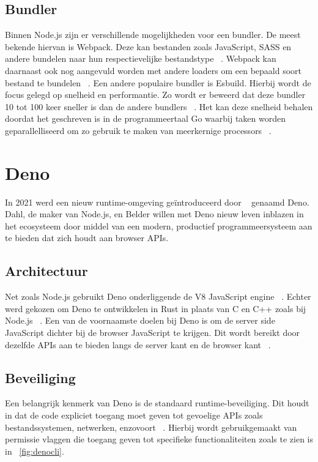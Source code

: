 \subsection{Bundler}
Binnen Node.js zijn er verschillende mogelijkheden voor een bundler. De meest bekende hiervan is Webpack. 
Deze kan bestanden zoals JavaScript, SASS en andere bundelen naar hun respectievelijke bestandstype ~\autocite{Laurila2020}. 
Webpack kan daarnaast ook nog aangevuld worden met andere loaders om een bepaald soort bestand te bundelen ~\autocite{Laurila2020}. Een andere populaire bundler is Esbuild.
Hierbij wordt de focus gelegd op snelheid en performantie. Zo wordt er beweerd dat deze bundler 10 tot 100 keer sneller is dan de andere bundlers ~\autocite{Couriol2020}.
Het kan deze snelheid behalen doordat het geschreven is in de programmeertaal Go waarbij taken worden geparallelliseerd om zo gebruik te maken van meerkernige processors ~\autocite{Couriol2020}.

\section{Deno}
In 2021 werd een nieuw runtime-omgeving geïntroduceerd door ~\textcite{Dahl2021} genaamd Deno.
Dahl, de maker van Node.js, en Belder willen met Deno nieuw leven inblazen in het ecosysteem door middel van een
modern, productief programmeersysteem aan te bieden dat zich houdt aan browser APIs.

\subsection{Architectuur}
Net zoals Node.js gebruikt Deno onderliggende de V8 JavaScript engine ~\autocite{DenoLand2023}. 
Echter werd gekozen om Deno te ontwikkelen in Rust in plaats van C en C++ zoals bij Node.js ~\autocite{DenoLand2023}.
Een van de voornaamste doelen bij Deno is om de server side JavaScript dichter bij de browser JavaScript te krijgen.
Dit wordt bereikt door dezelfde APIs aan te bieden langs de server kant en de browser kant ~\autocite{Barrow2022}.

\subsection{Beveiliging}
Een belangrijk kenmerk van Deno is de standaard runtime-beveiliging.
Dit houdt in dat de code expliciet toegang moet geven tot gevoelige APIs zoals bestandssystemen, netwerken, enzovoort ~\autocite{DenoLand2023}. 
Hierbij wordt gebruikgemaakt van permissie vlaggen die toegang geven tot specifieke functionaliteiten zoals te zien is in ~\ref{fig:denocli}.

